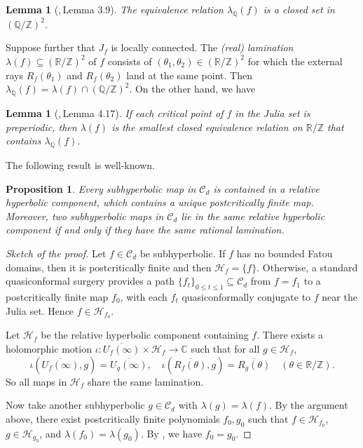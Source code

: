 \documentclass[a4paper,reqno,times, 11pt]{amsart}
\newtheorem{lemma}[theorem]{Lemma}
\newtheorem{proposition}[theorem]{Proposition}
\theoremstyle{remark}
\theoremstyle{plain}
\numberwithin{equation}{section}
\def\HHHH{\mathscr H}
\def\CCCC{\mathscr C}
\def\Q{\mathbb Q}
\begin{document}
	\begin{lemma}[\cite{K},\,Lemma 3.9]\label{lem:closed}
		The equivalence relation $\lambda_\Q(f)$ is a closed set in $(\Q/\mathbb{Z})^2$.
	\end{lemma}
	
	
	
	Suppose further that  $J_f$ is locally connected.
	The \emph{(real) lamination} $\lambda(f)\subseteq(\mathbb R / \mathbb Z)^2$ of $f$  consists of   $(\theta_1,\theta_2)\in (\mathbb R / \mathbb Z)^2$ for which the external rays $R_f(\theta_1)$ and $R_f(\theta_2)$ land at the same point. Then $\lambda_\Q(f)=\lambda(f)\cap (\Q/\mathbb{Z})^2$. On the other hand, we have
	
	
	
	
	\begin{lemma} [\cite{K},\,Lemma 4.17]
		\label{lem:rational}
		If each critical point of $f$ in the Julia set is preperiodic, then $\lambda(f)$ is
		the smallest closed equivalence relation on $\mathbb R / \mathbb Z$
		that contains $\lambda_\Q(f)$.
	\end{lemma}
	
	The following result is well-known.
	
	\begin{proposition}\label{pro:same1}
		Every subhyperbolic map in $\CCCC_d$ is contained in a relative hyperbolic component, which contains a unique postcritically finite map. Moreover, two subhyperbolic maps in $\CCCC_d$ lie in the same relative hyperbolic component if and only if they have the same rational lamination.
	\end{proposition}
	\begin{proof}[Sketch of the proof]
		Let $f \in \CCCC_d$ be subhyperbolic. If $f$ has no bounded Fatou domains, then it is postcritically finite and then $\HHHH_f = \{f\}$. Otherwise, a standard quasiconformal surgery \cite{DH2} provides a path $\{f_t\}_{0 \leq t \leq 1} \subseteq \CCCC_d$ from $f = f_1$ to a postcritically finite map $f_0$, with each $f_t$ quasiconformally conjugate to $f$ near the Julia set. Hence $f \in \HHHH_{f_0}$.
		
		Let $\HHHH_f$ be the relative hyperbolic component containing $f$. There exists a holomorphic motion $\iota: \overline{U_f(\infty)} \times \HHHH_f \to \mathbb{C}$ such that for all $g \in \HHHH_f$,
		\[
		\iota(\overline{U_f(\infty)}, g) = \overline{U_g(\infty)}, \quad
		\iota(\overline{R_f(\theta)}, g) = \overline{R_g(\theta)} \quad (\theta \in \mathbb{R}/\mathbb{Z}).
		\]
		So all maps in $\HHHH_f$ share the same lamination.
		
		Now take another subhyperbolic $g \in \CCCC_d$ with $\lambda(g) = \lambda(f)$. By the argument above, there exist postcritically finite polynomials $f_0, g_0$ such that $f \in \HHHH_{f_0}$, $g \in \HHHH_{g_0}$, and $\lambda(f_0) = \lambda(g_0)$. By \cite[Theorem 1.1]{Poi1}, we have $f_0 = g_0$.\end{proof}
	
\end{document}
